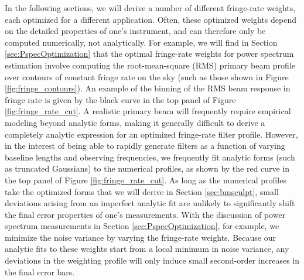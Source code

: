 \documentclass[twocolumn,apj,numberedappendix]{emulateapj}
\begin{document}
In the following sections, we will derive a number of different fringe-rate
weights, each optimized for a different application. Often, these optimized
weights depend on the detailed properties of one's instrument, and can
therefore only be computed numerically, not analytically. For example, we will
find in Section \ref{sec:PspecOptimization} that the optimal fringe-rate
weights for power spectrum estimation involve computing the root-mean-square
(RMS) primary beam profile over contours of constant fringe rate on the sky
(such as those shown in Figure \ref{fig:fringe_contours}).  An example of the
binning of the RMS beam response in fringe rate is given by the black curve in
the top panel of Figure \ref{fig:fringe_rate_cut}.  A realistic primary beam will
frequently require empirical modeling beyond analytic forms, making it generally
difficult to derive a completely analytic expression for an optimized
fringe-rate filter profile. However, in the interest of being able to rapidly
generate filters as a function of varying baseline lengths and observing
frequencies, we frequently fit analytic forms (such as truncated Gaussians) to
the numerical profiles, as shown by the red curve in the top panel of Figure
\ref{fig:fringe_rate_cut}.  As long as the numerical profiles take the
optimized forms that we will derive in Section \ref{sec:bmsculpt}, small
deviations arising from an imperfect analytic fit are unlikely to significantly
shift the final error properties of one's measurements. With the discussion of
power spectrum measurements in Section \ref{sec:PspecOptimization}, for
example, we minimize the noise variance by varying the fringe-rate weights.
Because our analytic fits to these weights start from a local minimum in noise
variance, any deviations in the weighting profile will only induce small
second-order increases in the final error bars.


%
%
\end{document}
